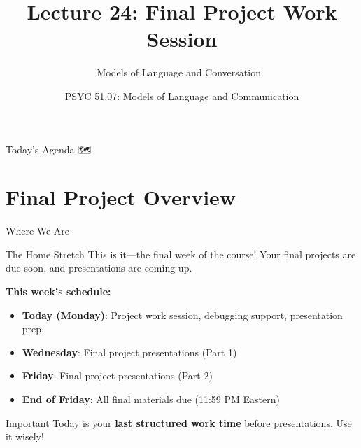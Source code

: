 \documentclass[aspectratio=169]{beamer}
\title{Lecture 24: Final Project Work Session}
\subtitle{Models of Language and Conversation 🤖}
\author{PSYC 51.07: Models of Language and Communication}
\institute{Dr. Jeremy R. Manning}
\date{}
\begin{document}
\begin{frame}[shrink=10]
\titlepage
\end{frame}

\begin{frame}{Today's Agenda 🗺️}
\tableofcontents
\end{frame}

\section{Final Project Overview}

\begin{frame}{Where We Are 🎯}
\small
\begin{block}{The Home Stretch}
This is it—the final week of the course! Your final projects are due soon, and presentations are coming up.
\end{block}

\vspace{0.3cm}

\textbf{This week's schedule:}
\begin{itemize}\setlength{\itemsep}{0pt}
    \item \textbf{Today (Monday)}: Project work session, debugging support, presentation prep
    \item \textbf{Wednesday}: Final project presentations (Part 1)
    \item \textbf{Friday}: Final project presentations (Part 2)
    \item \textbf{End of Friday}: All final materials due (11:59 PM Eastern)
\end{itemize}

\vspace{0.3cm}

\begin{alertblock}{Important}
Today is your \textbf{last structured work time} before presentations. Use it wisely!
\end{alertblock}
\end{frame}
\end{document}
